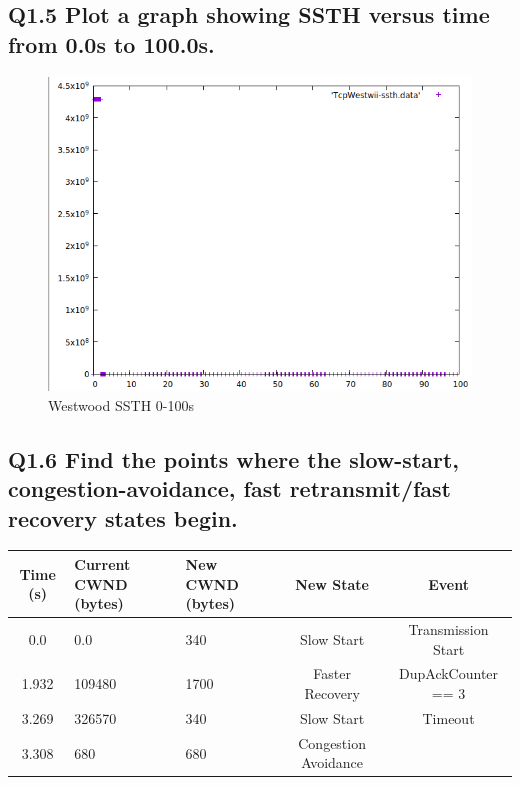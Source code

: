 \documentclass{article}
\begin{document}
\subsection{Q1.5 Plot a graph showing SSTH versus time from 0.0s to
100.0s.}

\begin{figure}[h]
    \centering
    \includegraphics[scale=0.4]{images/lab1-group11-task1-question5.png}
    \caption{Westwood SSTH 0-100s}
    \label{fig:cwnd_deflation}
\end{figure}

\newpage
\subsection{Q1.6 Find the points where the slow-start,
congestion-avoidance, fast retransmit/fast recovery states begin.}

\begin{table}[h]
\begin{tabular}{|c|p{25mm}|p{20mm}|c|c|}
\hline Time (s)    & Current CWND (bytes)    & New CWND (bytes)    & New State    & Event \\
\hline 0.0       &         0.0     &     340     &       Slow Start      &  Transmission Start\\ 
\hline 1.932     &      109480     &    1700   &       Faster Recovery   &  DupAckCounter == 3\\
\hline 3.269     &      326570     &     340     &       Slow Start      &  Timeout\\ 
\hline 3.308     &      680        &     680     &       Congestion Avoidance   &  \\   
\hline
\end{tabular} 
\end{table}
\end{document}
